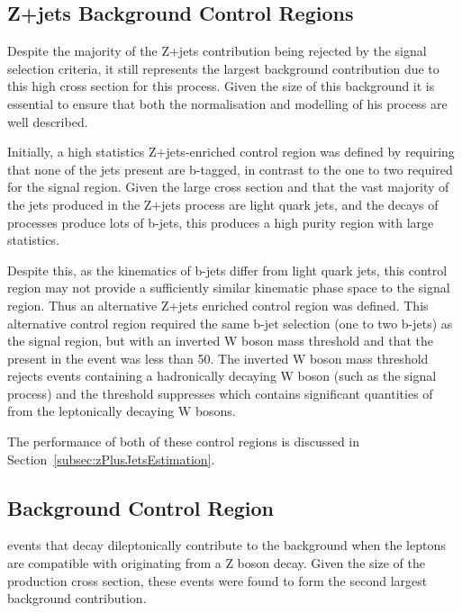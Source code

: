 
\subsection{Z+jets Background Control Regions}\label{subsec:zPlusJetsCR}
Despite the majority of the Z+jets contribution being rejected by the signal selection criteria, it still represents the largest background contribution due to this high cross section for this process.
Given the size of this background it is essential to ensure that both the normalisation and modelling of his process are well described.

Initially, a high statistics Z+jets-enriched control region was defined by requiring that none of the jets present are b-tagged, in contrast to the one to two required for the signal region.
Given the large cross section and that the vast majority of the jets produced in the Z+jets process are light quark jets, and the decays of \ttbar processes produce lots of b-jets, this produces a high purity region with large statistics.

Despite this, as the kinematics of b-jets differ from light quark jets, this control region may not provide a sufficiently similar kinematic phase space to the signal region.
Thus an alternative Z+jets enriched control region was defined.
This alternative control region required the same b-jet selection (one to two b-jets) as the signal region, but with an inverted W boson mass threshold and that the \MET present in the event was less than 50\GeV.
The inverted W boson mass threshold rejects events containing a hadronically decaying W boson (such as the signal process) and the \MET threshold suppresses \ttbar which contains significant quantities of \MET from the leptonically decaying W bosons.

The performance of both of these control regions is discussed in Section~\ref{subsec:zPlusJetsEstimation}.

\subsection{\ttbar Background Control Region}\label{subsec:ttbarCR}
\ttbar events that decay dileptonically contribute to the background when the leptons are compatible with originating from a Z boson decay.
Given the size of the \ttbar production cross section, these events were found to form the second largest background contribution.

